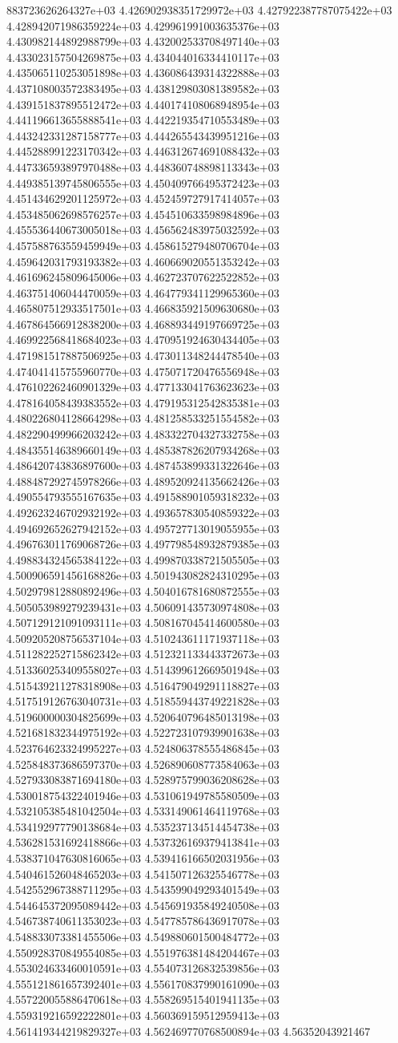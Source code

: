883723626264327e+03	4.426902938351729972e+03	4.427922387787075422e+03	4.428942071986359224e+03	4.429961991003635376e+03	4.430982144892988799e+03	4.432002533708497140e+03	4.433023157504269875e+03	4.434044016334410117e+03	4.435065110253051898e+03	4.436086439314322888e+03	4.437108003572383495e+03	4.438129803081389582e+03	4.439151837895512472e+03	4.440174108068948954e+03	4.441196613655888541e+03	4.442219354710553489e+03	4.443242331287158777e+03	4.444265543439951216e+03	4.445288991223170342e+03	4.446312674691088432e+03	4.447336593897970488e+03	4.448360748898113343e+03	4.449385139745806555e+03	4.450409766495372423e+03	4.451434629201125972e+03	4.452459727917414057e+03	4.453485062698576257e+03	4.454510633598984896e+03	4.455536440673005018e+03	4.456562483975032592e+03	4.457588763559459949e+03	4.458615279480706704e+03	4.459642031793193382e+03	4.460669020551353242e+03	4.461696245809645006e+03	4.462723707622522852e+03	4.463751406044470059e+03	4.464779341129965360e+03	4.465807512933517501e+03	4.466835921509630680e+03	4.467864566912838200e+03	4.468893449197669725e+03	4.469922568418684023e+03	4.470951924630434405e+03	4.471981517887506925e+03	4.473011348244478540e+03	4.474041415755960770e+03	4.475071720476556948e+03	4.476102262460901329e+03	4.477133041763623623e+03	4.478164058439383552e+03	4.479195312542835381e+03	4.480226804128664298e+03	4.481258533251554582e+03	4.482290499966203242e+03	4.483322704327332758e+03	4.484355146389660149e+03	4.485387826207934268e+03	4.486420743836897600e+03	4.487453899331322646e+03	4.488487292745978266e+03	4.489520924135662426e+03	4.490554793555167635e+03	4.491588901059318232e+03	4.492623246702932192e+03	4.493657830540859322e+03	4.494692652627942152e+03	4.495727713019055955e+03	4.496763011769068726e+03	4.497798548932879385e+03	4.498834324565384122e+03	4.499870338721505505e+03	4.500906591456168826e+03	4.501943082824310295e+03	4.502979812880892496e+03	4.504016781680872555e+03	4.505053989279239431e+03	4.506091435730974808e+03	4.507129121091093111e+03	4.508167045414600580e+03	4.509205208756537104e+03	4.510243611171937118e+03	4.511282252715862342e+03	4.512321133443372673e+03	4.513360253409558027e+03	4.514399612669501948e+03	4.515439211278318908e+03	4.516479049291118827e+03	4.517519126763040731e+03	4.518559443749221828e+03	4.519600000304825699e+03	4.520640796485013198e+03	4.521681832344975192e+03	4.522723107939901638e+03	4.523764623324995227e+03	4.524806378555486845e+03	4.525848373686597370e+03	4.526890608773584063e+03	4.527933083871694180e+03	4.528975799036208628e+03	4.530018754322401946e+03	4.531061949785580509e+03	4.532105385481042504e+03	4.533149061464119768e+03	4.534192977790138684e+03	4.535237134514454738e+03	4.536281531692418866e+03	4.537326169379413841e+03	4.538371047630816065e+03	4.539416166502031956e+03	4.540461526048465203e+03	4.541507126325546778e+03	4.542552967388711295e+03	4.543599049293401549e+03	4.544645372095089442e+03	4.545691935849240508e+03	4.546738740611353023e+03	4.547785786436917078e+03	4.548833073381455506e+03	4.549880601500484772e+03	4.550928370849554085e+03	4.551976381484204467e+03	4.553024633460010591e+03	4.554073126832539856e+03	4.555121861657392401e+03	4.556170837990161090e+03	4.557220055886470618e+03	4.558269515401941135e+03	4.559319216592222801e+03	4.560369159512959413e+03	4.561419344219829327e+03	4.562469770768500894e+03	4.56352043921467